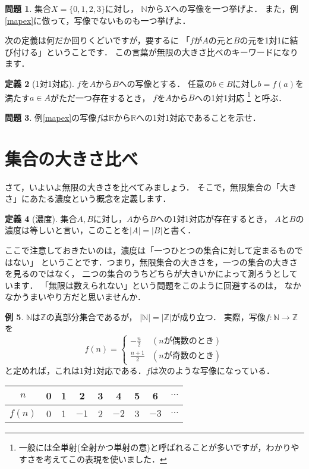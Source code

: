 ﻿\documentclass[./main]{subfiles} %
\theoremstyle{definition}
\newtheorem{hamadadefi}{定義}[section]
\newtheorem{hamadaex}[hamadadefi]{例}
\newtheorem{hamadaqst}[hamadadefi]{問題}
\begin{document}
\begin{hamadaqst}
\label{mapq}
集合$X=\{0,1,2,3\}$に対し，
$\mathbb{N}$から$X$への写像を一つ挙げよ．
また，例\ref{mapex}に倣って，写像でないものも一つ挙げよ．
\end{hamadaqst}

次の定義は何だか回りくどいですが，要するに
「$f$が$A$の元と$B$の元を1対1に結び付ける」ということです．
この言葉が無限の大きさ比べのキーワードになります．

\begin{hamadadefi}[1対1対応]
$f$を$A$から$B$への写像とする．
任意の$b\in B$に対し$b=f(a)$を満たす$a\in A$がただ一つ存在するとき，
$f$を$A$から$B$への1対1対応
\footnote{一般には全単射(全射かつ単射の意)と呼ばれることが多いですが，わかりやすさを考えてこの表現を使いました．}
と呼ぶ．
\end{hamadadefi}

\begin{hamadaqst}
\label{bijecq}
例\ref{mapex}の写像$f$は$\mathbb{R}$から$\mathbb{R}$への1対1対応であることを示せ．
\end{hamadaqst}

\section{集合の大きさ比べ}
さて，いよいよ無限の大きさを比べてみましょう．
そこで，無限集合の「大きさ」にあたる濃度という概念を定義します．

\begin{hamadadefi}[濃度]
集合$A,B$に対し，$A$から$B$への1対1対応が存在するとき，
$A$と$B$の濃度は等しいと言い，このことを$|A|=|B|$と書く．
\end{hamadadefi}

ここで注意しておきたいのは，濃度は「一つひとつの集合に対して定まるものではない」
ということです．つまり，無限集合の大きさを，一つの集合の大きさを見るのではなく，
二つの集合のうちどちらが大きいかによって測ろうとしています．
「無限は数えられない」という問題をこのように回避するのは，
なかなかうまいやり方だと思いませんか．

\begin{hamadaex}
\label{NandZ}
$\mathbb{N}$は$\mathbb{Z}$の真部分集合であるが，
$|\mathbb{N}|=|\mathbb{Z}|$が成り立つ．
実際，写像$f\colon\mathbb{N}\to\mathbb{Z}$を
\[
f(n)=
\begin{cases}
-\frac{n}{2} & (nが偶数のとき) \\
\frac{n+1}{2} & (nが奇数のとき)
\end{cases}
\]
と定めれば，これは1対1対応である．$f$は次のような写像になっている．
\begin{table}[h]
\centering
\begin{tabular}{c||c|c|c|c|c|c|c|c}
$n$&0&1&2&3&4&5&6&$\cdots$ \\\hline
$f(n)$&0&1&$-1$&2&$-2$&3&$-3$&$\cdots$
\end{tabular}
\end{table}
\end{hamadaex}
\end{document}
